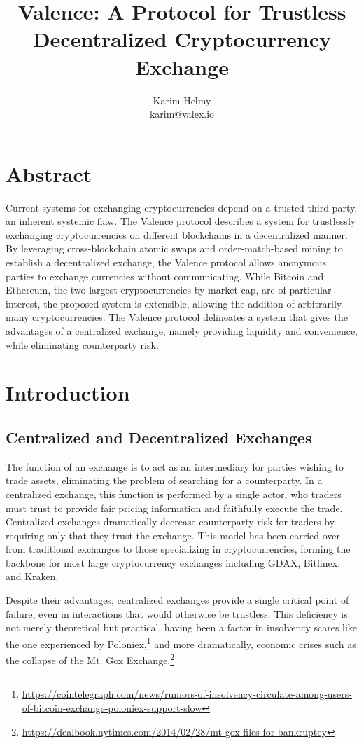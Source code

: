 \documentclass[a4paper]{article}
\title{Valence: A Protocol for Trustless Decentralized
		Cryptocurrency Exchange}
\author{Karim Helmy \\ karim@valex.io}
\begin{document}
\maketitle

\section*{Abstract}
	Current systems for exchanging cryptocurrencies depend on a
    trusted third party, an inherent systemic flaw.
    The Valence protocol describes a system for trustlessly
    exchanging cryptocurrencies on different blockchains in a decentralized
    manner. By leveraging cross-blockchain atomic swaps and order-match-based mining to establish a decentralized exchange, the
    Valence protocol allows anonymous parties to exchange currencies
    without communicating. While Bitcoin and Ethereum, the two
    largest cryptocurrencies by market cap, are of particular
    interest, the proposed system is extensible, allowing the
    addition of arbitrarily many cryptocurrencies. The Valence
    protocol delineates a system that gives the advantages of a
    centralized exchange, namely providing liquidity and convenience,
    while eliminating counterparty risk.

\tableofcontents
\newpage
{}
\section*{Introduction}
	\subsection*{Centralized and Decentralized Exchanges}
    The function of an exchange is to act as an intermediary for parties
    wishing to trade assets, eliminating the problem of
    searching for a counterparty. In a centralized exchange, this function
    is performed by a single actor, who traders must trust to provide fair
    pricing information and faithfully execute the trade. Centralized exchanges
    dramatically decrease counterparty risk for traders by requiring only
    that they trust the exchange. This model has been carried over from
    traditional exchanges to those specializing in cryptocurrencies, forming
    the backbone for most large cryptocurrency exchanges including GDAX,
    Bitfinex, and Kraken.

    Despite their advantages,
	centralized exchanges provide a single critical point of failure,
    even in interactions that would otherwise be trustless. This
    deficiency is not merely theoretical but practical, having been a
    factor in insolvency scares like the one experienced by
    Poloniex,\footnote[1]
    {\url{https://cointelegraph.com/news/rumors-of-insolvency-circulate-among-users-of-bitcoin-exchange-poloniex-support-slow}} and more
    dramatically, economic crises such as the collapse of the Mt. Gox
    Exchange.\footnote[2]
    {\url{https://dealbook.nytimes.com/2014/02/28/mt-gox-files-for-bankruptcy}}
\end{document}
